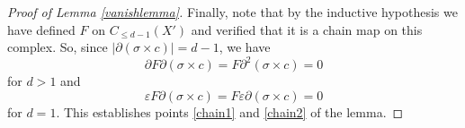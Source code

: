 \documentclass[10pt,a4paper]{amsart}
\begin{document}
\begin{proof}[Proof of Lemma \ref{vanishlemma}]
Finally, note that by the inductive hypothesis we have defined $F$ on $C_{\leq d-1}(X')$ and verified that it is a chain map on this complex. So, since $|\partial(\sigma\times c)|=d-1$, we have 
$$
\partial F\partial(\sigma\times c)=F\partial^2(\sigma\times c)=0
$$
for $d>1$ and 
$$
\varepsilon F\partial(\sigma\times c)=F\varepsilon\partial(\sigma\times c)=0
$$
for $d=1$. This establishes points \ref{chain1} and \ref{chain2} of the lemma.%



\end{proof}
\end{document}
